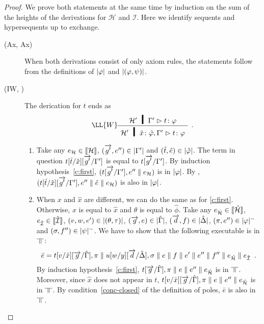\begin{proof}
 We prove both statements at the same time by induction on the sum of
 the heights of the derivations for $\mathcal H$ and $\mathcal I$.  Here
 we identify sequents and hypersequents up to exchange.
  \begin{description}
  \item[(Ax, Ax)] When both derivations consist of only axiom rules,
       the statements follow from the definitions of $|{\varphi}|$ and
       $|{(\varphi,\psi)}|$.
   \item[(IW, \textminus)]
	The derication for $t$ ends as
	\[
	 \aseq{\hyp'\G'}{\tj{t}{\phi}}
	\LL{W}
	\useq{\hyp'\tj{\hat{x}}{\hat{\phi}}, \G'}{\tj{t}{\phi}}
	\DisplayProof\enspace.
	\]
	\begin{enumerate}[label=\textit{(\arabic{*})}]
	 \item Take any
	       $e_{\mathcal H}\in \llbracket{\mathcal H}\rrbracket$,
	       $(\overrightarrow{g'}, e'')\in|{\Gamma'}|$ and $(\hat t,\hat
	       e)\in|{\hat{\varphi}}|$.
	       The term in question $t[\hat t/\hat x][\overrightarrow{g'}/\Gamma']$ is
	       equal to $t[\overrightarrow{g'}/\Gamma']$.
	       By induction hypothesis~\ref{c:first},
	       $(t[\overrightarrow{g'}/\Gamma'],e''\parallel e_{\mathcal H})$ is in $|{\varphi}|$.
	       By , $(t[\hat t/\hat x][\overrightarrow{g'}/\Gamma'],
	       e''\parallel \hat e\parallel e_{\mathcal H})$ is also in $|{\varphi}|$.
	 \item
	       When $x$ and $\hat x$ are different, we can do the same
	      as for \ref{c:first}.
	      Otherwise, $x$ is equal to $\hat x$ and $\theta$ is equal
	      to $\hat\phi$.
	      Take any
	      $e_{\hat{\mathcal{H}}}\in \llbracket{\hat{\mathcal{H}}}\rrbracket$,
	      $e_{\hat{\mathcal{I}}}\in \llbracket{\hat{\mathcal{I}}}\rrbracket$,
	      $(v,w,e')\in|{(\theta,\tau)}|$,
	      $(\overrightarrow g,e)\in|{\hat{\Gamma}}|$,
	      $(\overrightarrow d,f)\in|{\hat{\Delta}}|$,
	      $(\pi,e'')\in|{\varphi}|^-$ and
	      $(\sigma,f'')\in|{\psi}|^-$.
	      We have to show that the following executable is in
	      $\bbot$:
	      \[
	       \bar e = t[v/\hat x][\overrightarrow{g}/\hat{\Gamma}],\pi\parallel
	      u[w/y][\overrightarrow d/\hat {\Delta}], \sigma\parallel e\parallel f\parallel e'\parallel
	      e''\parallel f''\parallel e_{\hat{\mathcal{H}}}\parallel e_{\hat{\mathcal{I}}}\enspace.
	      \]
	      By induction hypothesis~\ref{c:first},
	      $
	       t[\overrightarrow g/\hat {\Gamma}],\pi\parallel e\parallel e''\parallel e_{\hat{\mathcal{H}}}
	      $
	      is in $\bbot$.  Moreover, since $\hat x$ does not appear
	      in $t$,  $t[v/\hat x][\overrightarrow g/\hat {\Gamma}],\pi\parallel e\parallel
	      e''\parallel e_{\hat{\mathcal{H}}}$
	      is in $\bbot$.  By condition~\ref{conc-closed} of the
	      definition of poles, $\bar e$ is also in $\bbot$.
	\end{enumerate}

\end{description}
\end{proof}
